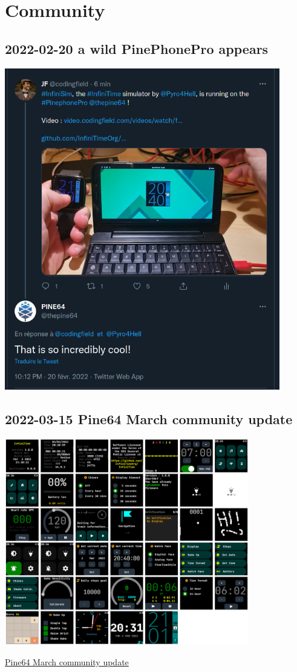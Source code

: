 \documentclass{beamer}
\begin{document}
\section{Community}
\subsection{2022-02-20 a wild PinePhonePro appears}
\begin{frame}{}
  \centering\includegraphics[width=0.9\textwidth]{../2022-02-20_InfiniSim_on_PinePhonePro}
\end{frame}

\subsection{2022-03-15 Pine64 March community update}
\begin{frame}{}
  \centering\includegraphics[width=0.8\textwidth]{../2022-03-15_pinetime_montage}

  \small \href{https://www.pine64.org/2022/03/15/march-update-introducing-the-quartzpro64/}{Pine64 March community update}
\end{frame}
\end{document}

